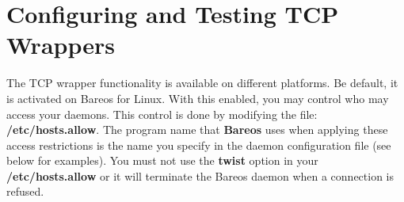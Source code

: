 \section{Configuring and Testing TCP Wrappers}
\label{wrappers}

The TCP wrapper functionality is available on different platforms.
Be default, it is activated on Bareos for Linux.
With this enabled, you may control who may access your
daemons.  This control is done by modifying the file: {\bf
/etc/hosts.allow}.  The program name that {\bf Bareos} uses when
applying these access restrictions is the name you specify in the
daemon configuration file (see below for examples).
You must not use the {\bf twist} option in your {\bf
/etc/hosts.allow} or it will terminate the Bareos daemon when a
connection is refused.

